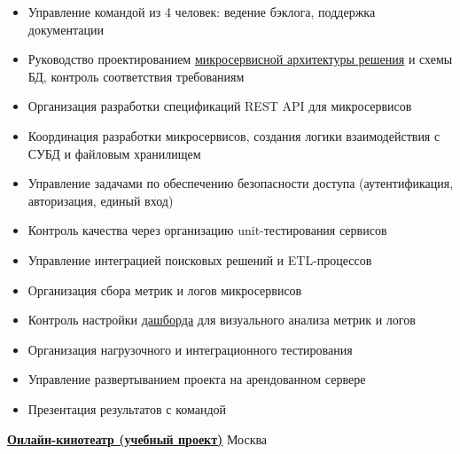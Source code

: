 \documentclass[14pt, a4paper, oneside]{extarticle}
\begin{document}
\begin{itemize}
	\vspace{-2\intextsep}	
    \item Управление командой из 4 человек: ведение бэклога, поддержка документации
	\vspace{-0.8\intextsep}
	\item Руководство проектированием \href{https://github.com/Crazy5202/job_application_form/tree/main/portfolio/eComm_C4.pdf}{микросервисной архитектуры решения} и схемы БД, контроль соответствия требованиям
	\vspace{-0.8\intextsep}
	\item Организация разработки спецификаций REST API для микросервисов
	\vspace{-0.8\intextsep}
	\item Координация разработки микросервисов, создания логики взаимодействия с СУБД и файловым хранилищем
	\vspace{-0.8\intextsep}
	\item Управление задачами по обеспечению безопасности доступа (аутентификация, авторизация, единый вход)
	\vspace{-0.8\intextsep}
	\item Контроль качества через организацию unit-тестирования сервисов
	\vspace{-0.8\intextsep}
	\item Управление интеграцией поисковых решений и ETL-процессов
	\vspace{-0.8\intextsep}
	\item Организация сбора метрик и логов микросервисов
	\vspace{-0.8\intextsep}
	\item Контроль настройки \href{https://github.com/Crazy5202/job_application_form/tree/main/portfolio/eComm_Grafana.pdf}{дашборда} для визуального анализа метрик и логов
	\vspace{-0.8\intextsep}
	\item Организация нагрузочного и интеграционного тестирования
    \vspace{-0.8\intextsep}
    \item Управление развертыванием проекта на арендованном сервере
    \vspace{-0.8\intextsep}
    \item Презентация результатов с командой
\end{itemize}


\begin{flushleft}
	\vspace{-\intextsep}
	\quad
	\href{https://github.com/Crazy5202/Python_project}{\textbf{Онлайн-кинотеатр (учебный проект)}}
	\hfill
	Москва
\end{flushleft}
\end{document}
